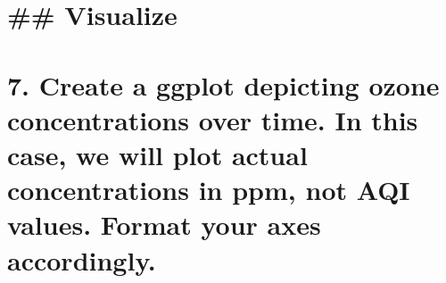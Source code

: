 \documentclass[]{article}
\newenvironment{Shaded}{\begin{snugshade}}{\end{snugshade}}
\newcommand{\CommentTok}[1]{\textcolor[rgb]{0.56,0.35,0.01}{\textit{#1}}}
\newcommand{\DataTypeTok}[1]{\textcolor[rgb]{0.13,0.29,0.53}{#1}}
\newcommand{\DecValTok}[1]{\textcolor[rgb]{0.00,0.00,0.81}{#1}}
\newcommand{\FloatTok}[1]{\textcolor[rgb]{0.00,0.00,0.81}{#1}}
\newcommand{\KeywordTok}[1]{\textcolor[rgb]{0.13,0.29,0.53}{\textbf{#1}}}
\newcommand{\NormalTok}[1]{#1}
\newcommand{\OperatorTok}[1]{\textcolor[rgb]{0.81,0.36,0.00}{\textbf{#1}}}
\newcommand{\StringTok}[1]{\textcolor[rgb]{0.31,0.60,0.02}{#1}}
\begin{document}
\begin{Shaded}
\end{Shaded}

\hypertarget{section}{%
\section{}\label{section}}

\hypertarget{visualize}{%
\section{\#\# Visualize}\label{visualize}}

\hypertarget{section-1}{%
\section{}\label{section-1}}

\hypertarget{create-a-ggplot-depicting-ozone-concentrations-over-time.-in-this-case-we-will-plot-actual-concentrations-in-ppm-not-aqi-values.-format-your-axes-accordingly.}{%
\section{7. Create a ggplot depicting ozone concentrations over time. In
this case, we will plot actual concentrations in ppm, not AQI values.
Format your axes
accordingly.}\label{create-a-ggplot-depicting-ozone-concentrations-over-time.-in-this-case-we-will-plot-actual-concentrations-in-ppm-not-aqi-values.-format-your-axes-accordingly.}}
\end{document}
